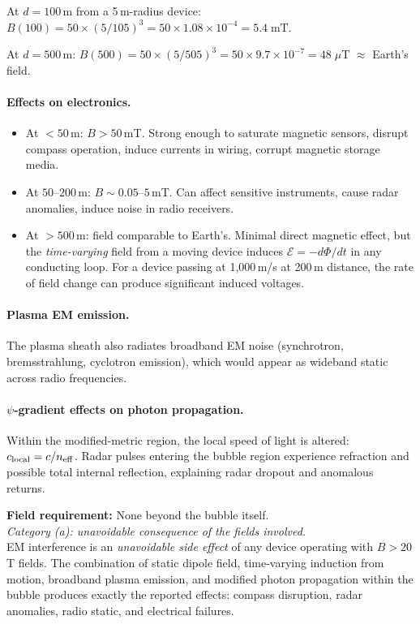 \documentclass[12pt,a4paper]{article}
\begin{document}
At $d = 100$\,m from a 5\,m-radius device:
$B(100) = 50\times(5/105)^3 = 50\times 1.08\times 10^{-4} = 5.4\;\text{mT}$.

At $d = 500$\,m: $B(500) = 50\times(5/505)^3 = 50\times 9.7\times 10^{-7}
= 48\;\mu$T $\approx$ Earth's field.

\paragraph{Effects on electronics.}
\begin{itemize}
\item At $< 50$\,m: $B > 50$\,mT.  Strong enough to saturate magnetic
  sensors, disrupt compass operation, induce currents in wiring,
  corrupt magnetic storage media.
\item At $50$--$200$\,m: $B \sim 0.05$--$5$\,mT.  Can affect
  sensitive instruments, cause radar anomalies, induce noise in
  radio receivers.
\item At $> 500$\,m: field comparable to Earth's.  Minimal direct
  magnetic effect, but the \emph{time-varying} field from a moving
  device induces $\mathcal{E} = -d\Phi/dt$ in any conducting loop.
  For a device passing at 1{,}000\,m/s at 200\,m distance, the
  rate of field change can produce significant induced voltages.
\end{itemize}

\paragraph{Plasma EM emission.}
The plasma sheath also radiates broadband EM noise (synchrotron,
bremsstrahlung, cyclotron emission), which would appear as
wideband static across radio frequencies.

\paragraph{$\psi$-gradient effects on photon propagation.}
Within the modified-metric region, the local speed of light is
altered: $c_{\rm local} = c/n_{\rm eff}$.  Radar pulses entering
the bubble region experience refraction and possible total internal
reflection, explaining radar dropout and anomalous returns.

\begin{tcolorbox}[colback=green!5!white, colframe=green!60!black,
  title=EM Interference Assessment]
\textbf{Field requirement:} None beyond the bubble itself.\\
\emph{Category (a): unavoidable consequence of the fields involved.}\\[4pt]
EM interference is an \emph{unavoidable side effect} of any device
operating with $B > 20$\,T fields.  The combination of static dipole
field, time-varying induction from motion, broadband plasma emission,
and modified photon propagation within the bubble produces exactly
the reported effects: compass disruption, radar anomalies, radio
static, and electrical failures.
\end{tcolorbox}
\end{document}
